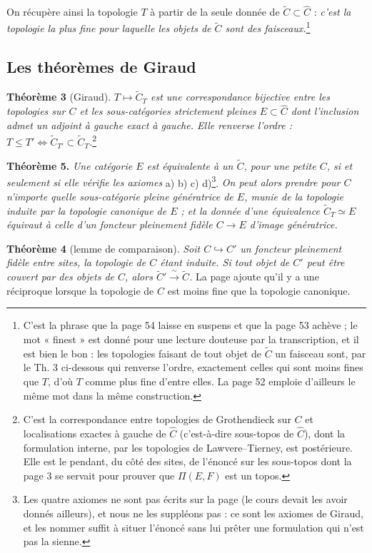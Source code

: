 \documentclass[11pt,a4paper]{article}
\begin{document}
On récupère ainsi la topologie $T$ à partir de la seule donnée de
$\widetilde{C} \subset \widehat{C}$ : \emph{c'est la topologie la plus fine
pour laquelle les objets de $\widetilde{C}$ sont des faisceaux.}\footnote{C'est
la phrase que la page 54 laisse en suspens et que la page 53 achève ; le mot
« finest » est donné pour une lecture douteuse par la transcription, et il est
bien le bon : les topologies faisant de tout objet de $\widetilde{C}$ un
faisceau sont, par le Th. 3 ci-dessous qui renverse l'ordre, exactement celles
qui sont moins fines que $T$, d'où $T$ comme plus fine d'entre elles. La
page 52 emploie d'ailleurs le même mot dans la même construction.}

\subsection*{Les théorèmes de Giraud}

\textbf{Théorème 3} (Giraud). \emph{$T \mapsto \widetilde{C}_{T}$ est une
correspondance bijective entre les topologies sur $C$ et les sous-catégories
strictement pleines $E \subset \widehat{C}$ dont l'inclusion admet un adjoint à
gauche exact à gauche. Elle renverse l'ordre :
$T \leq T' \iff \widetilde{C}_{T'} \subset \widetilde{C}_{T}$.}\footnote{C'est
la correspondance entre topologies de Grothendieck sur $C$ et localisations
exactes à gauche de $\widehat{C}$ (c'est-à-dire sous-topos de $\widehat{C}$),
dont la formulation interne, par les topologies de Lawvere--Tierney, est
postérieure. Elle est le pendant, du côté des sites, de l'énoncé sur les
sous-topos dont la page 3 se servait pour prouver que $\Pi(E,F)$ est un topos.}

\textbf{Théorème 5.} \emph{Une catégorie $E$ est équivalente à un
$\widetilde{C}$, pour une petite $C$, si et seulement si elle vérifie les
axiomes} a) b) c) d)\footnote{Les quatre axiomes ne sont pas écrits sur la
page (le cours devait les avoir donnés ailleurs), et nous ne les suppléons
pas : ce sont les axiomes de Giraud, et les nommer suffit à situer l'énoncé
sans lui prêter une formulation qui n'est pas la sienne.}. \emph{On peut alors
prendre pour $C$ n'importe quelle sous-catégorie pleine génératrice de $E$,
munie de la topologie induite par la topologie canonique de $E$ ; et la donnée
d'une équivalence $\widetilde{C}_{T} \simeq E$ équivaut à celle d'un foncteur
pleinement fidèle $C \to E$ d'image génératrice.}

\textbf{Théorème 4} (lemme de comparaison). \emph{Soit $C \hookrightarrow C'$
un foncteur pleinement fidèle entre sites, la topologie de $C$ étant induite. Si
tout objet de $C'$ peut être couvert par des objets de $C$, alors
$\widetilde{C}' \xrightarrow{\ \sim\ } \widetilde{C}$.} La page ajoute qu'il y a
une réciproque lorsque la topologie de $C$ est moins fine que la topologie
canonique.
\end{document}

